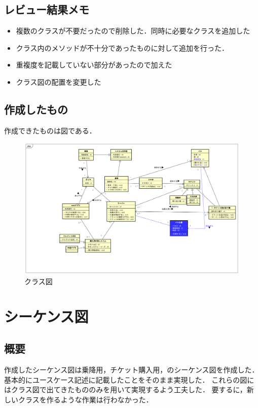\documentclass[documentclass]{jsarticle}
\begin{document}
\subsection*{レビュー結果メモ}
\begin{itemize}
  \item 複数のクラスが不要だったので削除した．同時に必要なクラスを追加した
  \item クラス内のメソッドが不十分であったものに対して追加を行った．
  \item 重複度を記載していない部分があったので加えた
  \item クラス図の配置を変更した
\end{itemize}

\subsection*{作成したもの}
作成できたものは図である．

\begin{figure}[H]
  \begin{center}
    \includegraphics*[scale=0.3]{figure/5-1.png}
  \end{center}
  \caption{クラス図}
  \label{fig:5-1}
\end{figure}

\newpage

\section{シーケンス図}
\subsection*{概要}
作成したシーケンス図は乗降用，チケット購入用，のシーケンス図を作成した．
基本的にユースケース記述に記載したことをそのまま実現した．
これらの図にはクラス図で出てきたもののみを用いて実現するよう工夫した．
要するに，新しいクラスを作るような作業は行わなかった．
\end{document}
